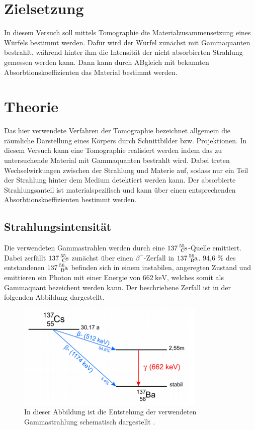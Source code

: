 \section{Zielsetzung}
\label{sec:Zielsetzung}

In diesem Versuch soll mittels Tomographie die Materialzusammensetzung eines Würfels
bestimmt werden. Dafür wird der Würfel zunächst mit Gammaquanten bestrahlt, 
während hinter ihm die Intensität der nicht absorbierten Strahlung gemessen werden 
kann. Dann kann durch ABgleich mit bekannten Absorbtionskoeffizienten das Material bestimmt
werden.

\section{Theorie}
\label{sec:Theorie}

Das hier verwendete Verfahren der Tomographie bezeichnet allgemein die räumliche Darstellung 
eines Körpers durch Schnittbilder bzw. Projektionen. In diesem Versuch kann eine 
Tomographie realisiert werden indem das zu untersuchende Material mit Gammaquanten 
bestrahlt wird. Dabei treten Wechselwirkungen zwischen der Strahlung und Materie auf, 
sodass nur ein Teil der Strahlung hinter dem Medium detektiert werden kann. 
Der absorbierte Strahlungsanteil ist materialspezifisch und kann über einen entsprechenden
Absorbtionskoeffizienten bestimmt werden.

\subsection{Strahlungsintensität}

Die verwendeten Gammastrahlen werden durch eine $\ce{137^55_Cs}$-Quelle emittiert. 
Dabei zerfällt $\ce{137^55_Cs}$ zunächst über einen $\beta^-$-Zerfall in  $\ce{137^56_Ba}$.
94,6 \% des entstandenen $\ce{137^56_Ba}$ befinden sich in einem instabilen, angeregten 
Zustand und emittieren ein Photon mit einer Energie von $\SI{662}{\kilo\eV}$, welches 
somit als Gammaquant bezeichent werden kann. 
Der beschriebene Zerfall ist in der folgenden Abbildung dargestellt.

\begin{figure}
	\centering
	\includegraphics[width=0.8\textwidth]{figure/Zerfall.pdf}
	\caption{In dieser Abbildung ist die Entstehung der verwendeten Gammastrahlung
	schematisch dargestellt \cite{1}.} 
	\label{abb1}
\end{figure}

